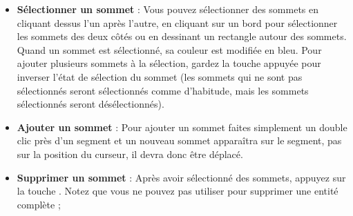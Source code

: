 \begin{itemize}[label=--]
\item \textbf{Sélectionner un sommet} : Vous pouvez sélectionner des sommets en 
cliquant dessus l'un après l'autre, en cliquant sur un bord pour sélectionner les 
sommets des deux côtés ou en dessinant un rectangle autour des sommets. Quand un 
sommet est sélectionné, sa couleur est modifiée en bleu. Pour ajouter plusieurs 
sommets à la sélection, gardez la touche  appuyée pour inverser 
l'état de sélection du sommet (les sommets qui ne sont pas sélectionnés seront sélectionnés comme d'habitude, mais les sommets sélectionnés seront désélectionnés).
\item \textbf{Ajouter un sommet} : Pour ajouter un sommet faites simplement un 
double clic près d'un segment et un nouveau sommet apparaîtra sur le segment, pas 
sur la position du curseur, il devra donc être déplacé.
\item \textbf{Supprimer un sommet} : Après avoir sélectionné des sommets, 
appuyez sur la touche . Notez que vous ne pouvez pas utiliser 
 pour supprimer une entité complète ; 

\end{itemize}
